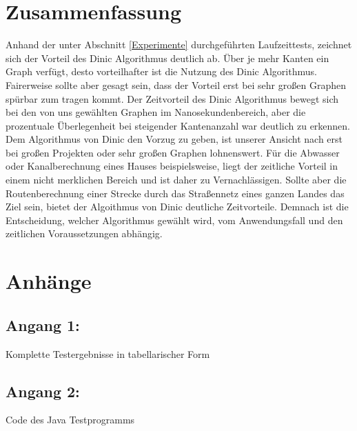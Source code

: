 \documentclass[a4paper]{llncs}
\begin{document}
\section{Zusammenfassung}
\label{Zusammenfassung}
Anhand der unter Abschnitt \ref{Experimente} durchgeführten Laufzeittests, zeichnet sich der Vorteil des Dinic Algorithmus deutlich ab. Über je mehr Kanten ein Graph verfügt, desto vorteilhafter ist die Nutzung des Dinic Algorithmus. Fairerweise sollte aber gesagt sein, dass der Vorteil erst bei sehr großen Graphen spürbar zum tragen kommt. Der Zeitvorteil des Dinic Algorithmus bewegt sich bei den von uns gewählten Graphen im Nanosekundenbereich, aber die prozentuale Überlegenheit bei steigender Kantenanzahl war deutlich zu erkennen. Dem Algorithmus von Dinic den Vorzug zu geben, ist unserer Ansicht nach erst bei großen Projekten oder sehr großen Graphen lohnenswert. Für die Abwasser oder Kanalberechnung eines Hauses beispielsweise, liegt der zeitliche Vorteil in einem nicht merklichen Bereich und ist daher zu Vernachlässigen. Sollte aber die Routenberechnung einer Strecke durch das Straßennetz eines ganzen Landes das Ziel sein, bietet der Algoithmus von Dinic deutliche Zeitvorteile. Demnach ist die Entscheidung, welcher Algorithmus gewählt wird, vom Anwendungsfall und den zeitlichen Voraussetzungen abhängig.


 

\section{Anhänge}
\subsection{Angang 1:}
\label{gesamttabelle}
Komplette Testergebnisse in tabellarischer Form



\subsection{Angang 2:}
\label{code}
Code des Java Testprogramms

\end{document}
